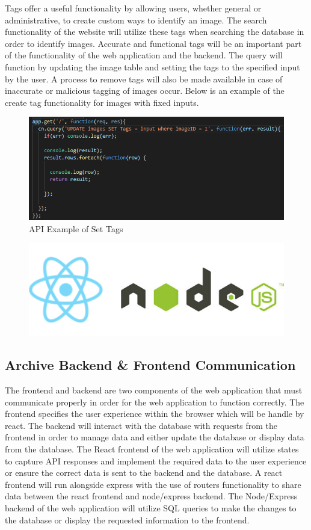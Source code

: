 \documentclass[12pt]{article}
\begin{document}
Tags offer a useful functionality by allowing users, whether general or administrative, to create custom ways to identify an image.  The search functionality of the website will utilize these tags when searching the database in order to identify images.  Accurate and functional tags will be an important part of the functionality of the web application and the backend.  The query will function by updating the image table and setting the tags to the specified input by the user.  A process to remove tags will also be made available in case of inaccurate or malicious tagging of images occur.  Below is an example of the create tag functionality for images with fixed inputs.

\begin{figure}[h]
	\centering
	\includegraphics[scale=0.5]{api_create_tags}
	\caption{API Example of Set Tags}
	\label{fig:API Set Tags}
\end{figure}

\begin{figure}[h]
	\centering
	\includegraphics[width=0.251\linewidth]{react_node}
\end{figure}

\subsection{Archive Backend \& Frontend Communication}

The frontend and backend are two components of the web application that must communicate properly in order for the web application to function correctly.  The frontend specifies the user experience within the browser which will be handle by react.  The backend will interact with the database with requests from the frontend in order to manage data and either update the database or display data from the database.
The React frontend of the web application will utilize states to capture API responses and implement the required data to the user experience or ensure the correct data is sent to the backend and the database.  A react frontend will run alongside express with the use of routers functionality to share data between the react frontend and node/express backend.
The Node/Express backend of the web application will utilize SQL queries to make the changes to the database or display the requested information to the frontend.
\end{document}
